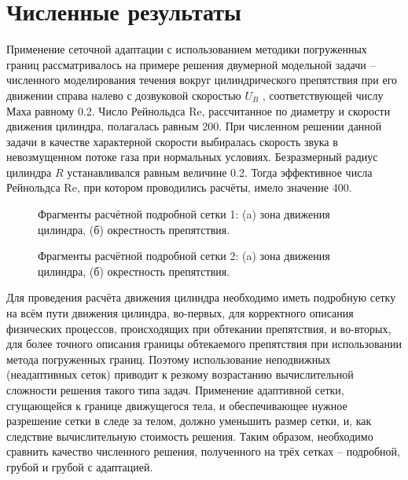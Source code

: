 \chapter{Численные результаты} \label{ch:ch3}
Применение сеточной адаптации с использованием методики погруженных границ рассматривалось на примере решения двумерной модельной задачи – численного моделирования течения вокруг цилиндрического препятствия при его движении справа налево с дозвуковой скоростью $U_B$ , соответствующей числу Маха равному 0.2. Число Рейнольдса Re, рассчитанное по диаметру и скорости движения цилиндра, полагалась равным 200. При численном решении данной задачи в качестве характерной скорости выбиралась скорость звука в невозмущенном потоке газа при нормальных условиях. Безразмерный радиус цилиндра $R$  устанавливался равным величине 0.2. Тогда эффективное числа Рейнольдса Re, при котором проводились расчёты, имело значение 400.
\begin{figure}
	{\centering
		\hfill
	}
	\caption[Фрагменты расчётной подробной сетки 1]{Фрагменты расчётной подробной сетки 1: (a) зона движения цилиндра, (б) окрестность препятствия.}
	\label{fig:setka1}
\end{figure}
\begin{figure}
	{\centering
		\hfill
	}
	\caption[Фрагменты расчётной подробной сетки 2]{Фрагменты расчётной подробной сетки 2: (a) зона движения цилиндра, (б) окрестность препятствия.}
		\label{fig:setka2}
\end{figure}

Для проведения расчёта движения цилиндра необходимо иметь подробную сетку на всём пути движения цилиндра, во-первых, для корректного описания физических процессов, происходящих при обтекании препятствия, и во-вторых, для более точного описания границы обтекаемого препятствия при использовании метода погруженных границ. Поэтому использование неподвижных (неадаптивных сеток) приводит к резкому возрастанию вычислительной сложности решения такого типа задач. Применение адаптивной сетки, сгущающейся к границе движущегося тела, и обеспечивающее нужное разрешение сетки в следе за телом, должно уменьшить размер сетки, и, как следствие вычислительную стоимость решения. Таким образом, необходимо сравнить качество численного решения, полученного на трёх сетках – подробной, грубой и грубой с адаптацией.

